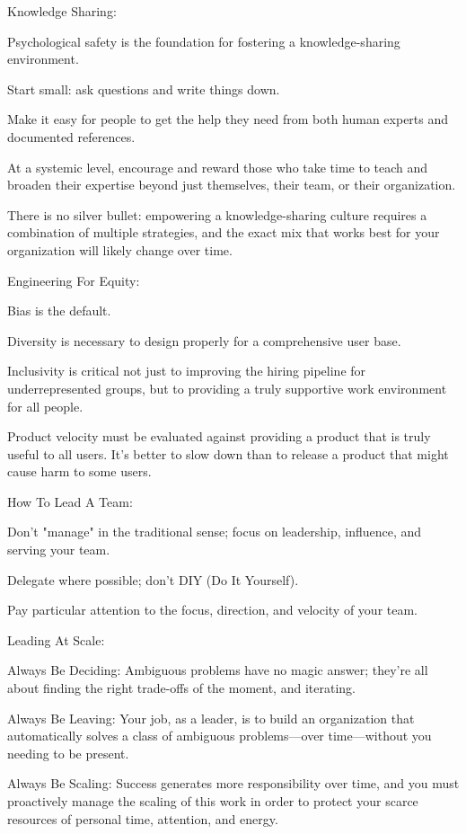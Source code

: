 Knowledge Sharing:
\bit
\item Psychological safety is the foundation for fostering a knowledge-sharing environment.
\item Start small: ask questions and write things down.
\item Make it easy for people to get the help they need from both human experts and documented references.
\item At a systemic level, encourage and reward those who take time to teach and broaden their expertise beyond just
themselves, their team, or their organization.
\item There is no silver bullet: empowering a knowledge-sharing culture requires a combination of multiple strategies,
and the exact mix that works best for your organization will likely change over time.
\eit

Engineering For Equity:
\bit
\item Bias is the default.
\item Diversity is necessary to design properly for a comprehensive user base.
\item Inclusivity is critical not just to improving the hiring pipeline for underrepresented groups, but to providing a
truly supportive work environment for all people.
\item Product velocity must be evaluated against providing a product that is truly useful to all users. It's better to
slow down than to release a product that might cause harm to some users.
\eit

How To Lead A Team:
\bit
\item Don't "manage" in the traditional sense; focus on leadership, influence, and serving your team.
\item Delegate where possible; don't DIY (Do It Yourself).
\item Pay particular attention to the focus, direction, and velocity of your team.
\eit

Leading At Scale:
\bit
\item Always Be Deciding: Ambiguous problems have no magic answer; they're all about finding the right trade-offs of the
moment, and iterating.
\item Always Be Leaving: Your job, as a leader, is to build an organization that automatically solves a class of
ambiguous problems—over time—without you needing to be present.
\item Always Be Scaling: Success generates more responsibility over time, and you must proactively manage the scaling
of this work in order to protect your scarce resources of personal time, attention, and energy.
\eit

